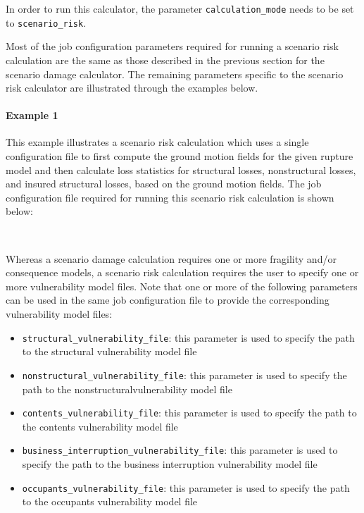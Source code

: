 In order to run this calculator, the parameter \Verb+calculation_mode+ needs
to be set to \Verb+scenario_risk+. 

Most of the job configuration parameters required for running a scenario risk
calculation are the same as those described in the previous section for the
scenario damage calculator. The remaining parameters specific to the scenario
risk calculator are illustrated through the examples below.


\paragraph{Example 1}

This example illustrates a scenario risk calculation which uses a single
configuration file to first compute the ground motion fields for the given
rupture model and then calculate loss statistics for structural losses,
nonstructural losses, and insured structural losses, based on the ground
motion fields. The job configuration file required for running this scenario
risk calculation is shown below:

\inputminted[firstline=1,firstnumber=1,fontsize=\footnotesize,frame=single,linenos,bgcolor=lightgray,label=job.ini]{ini}{oqum/risk/verbatim/config_scenario_risk_combined.ini}\\

Whereas a scenario damage calculation requires one or more fragility and/or
consequence models, a scenario risk calculation requires the user to specify
one or more vulnerability model files. Note that one or more of the following
parameters can be used in the same job configuration file to provide the
corresponding vulnerability model files:

\begin{itemize}

  \item \Verb+structural_vulnerability_file+: this parameter is used to
    specify the path to the structural \gls{vulnerability model} file

  \item \Verb+nonstructural_vulnerability_file+: this parameter is used to
    specify the path to the nonstructural\gls{vulnerability model} file

  \item \Verb+contents_vulnerability_file+: this parameter is used to
    specify the path to the contents \gls{vulnerability model} file

  \item \Verb+business_interruption_vulnerability_file+: this parameter is
    used to specify the path to the business interruption
    \gls{vulnerability model} file

  \item \Verb+occupants_vulnerability_file+: this parameter is used to
    specify the path to the occupants \gls{vulnerability model} file

\end{itemize}

